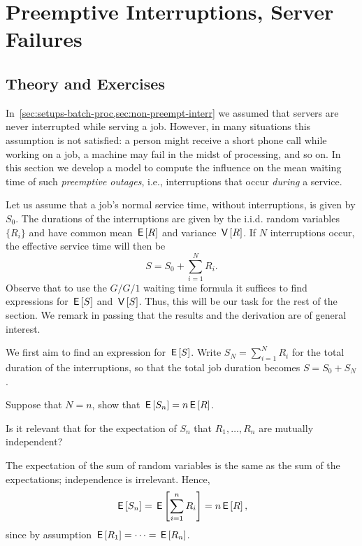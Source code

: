 \section{Preemptive Interruptions, Server Failures}
\label{sec:preempt-interr-serv}

\subsection*{Theory and Exercises}



In~\cref{sec:setups-batch-proc,sec:non-preempt-interr} we assumed that servers are never interrupted while serving a job.
However, in many situations this assumption is not satisfied: a person might receive a short phone call while working on a job, a machine may fail in the midst of processing, and so on.
In this section we develop a model to compute the influence on the mean waiting time of such \emph{preemptive outages}, i.e., interruptions that occur \emph{during} a service.

Let us assume that a job's normal service time, without interruptions, is given by $S_0$. The durations of the interruptions are given by the i.i.d. random variables $\{R_i\}$ and have common mean $\,\mathsf{E}\left[R\right]$ and variance $\,\mathsf{V}\left[R\right]$. If $N$ interruptions occur, the effective service time will then be
\begin{equation*}
S= S_0 + \sum_{i=1}^N R_i.
\end{equation*}
Observe that to use the $G/G/1$ waiting time formula it suffices to find expressions for $\,\mathsf{E}\left[S\right]$ and $\,\mathsf{V}\left[S\right]$.
Thus, this will be our task for the rest of the section.
We remark in passing that the results and the derivation are of general interest.

We first aim to find an expression for $\,\mathsf{E}\left[S\right]$.  Write  $S_N = \sum_{i=1}^N R_i$ for the total duration of the interruptions, so that the total job duration becomes $S = S_0 + S_N$.

\begin{exercise}
  Suppose that $N=n$, show that $\,\mathsf{E}\left[S_n\right]=n\,\mathsf{E}\left[R\right]$.
\begin{hint}
    Is it relevant that for the expectation of $S_n$ that $R_1,\ldots, R_n$ are mutually independent?
  \end{hint}
\begin{solution}
The expectation of the sum of random variables is the same as the sum of the expectations; independence is irrelevant. Hence,
\begin{equation*}
  \,\mathsf{E}\left[S_n \right] =  \,\mathsf{E}\left[\sum_{i=1}^n R_i\right]=  n \,\mathsf{E}\left[R\right], 
\end{equation*}
since by assumption $\,\mathsf{E}\left[R_1\right] = \cdots = \,\mathsf{E}\left[R_n\right]$. 
\end{solution}
\end{exercise}

